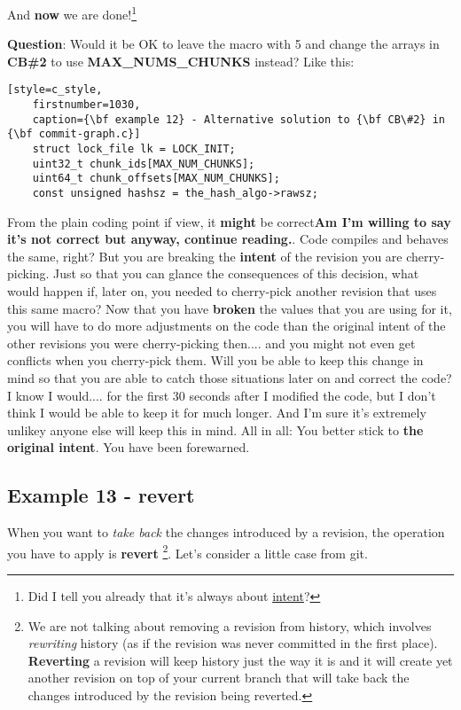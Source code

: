 And {\bf now} we are done!\footnote{Did I tell you already that it's always about \hyperref[intent]{intent}?}

{\bf Question}: Would it be OK to leave the macro with 5 and change the arrays in {\bf CB\#2} to use {\bf MAX\_NUMS\_CHUNKS} instead?
Like this:

\begin{lstlisting}[style=c_style,
	firstnumber=1030,
	caption={\bf example 12} - Alternative solution to {\bf CB\#2} in {\bf commit-graph.c}]
	struct lock_file lk = LOCK_INIT;
	uint32_t chunk_ids[MAX_NUM_CHUNKS];
	uint64_t chunk_offsets[MAX_NUM_CHUNKS];
	const unsigned hashsz = the_hash_algo->rawsz;
\end{lstlisting}

From the plain coding point if view, it {\bf might} be correct{\bf Am I'm willing to say it's not correct but anyway, continue reading.}.
Code compiles and behaves the same, right? But you are breaking the {\bf intent} of the revision you are cherry-picking. Just so that you
can glance the consequences of this decision, what would happen if, later on, you needed to cherry-pick another revision that uses this
same macro? Now that you have {\bf broken} the values that you are using for it, you will have to do more adjustments on the code than
the original intent of the other revisions you were cherry-picking then.... and you might not even get conflicts when you cherry-pick
them. Will you be able to keep this change in mind so that you are able to catch those situations later on and correct the code?
I know I would.... for the first 30 seconds after I modified the code, but I don't think I would be able to keep it for much longer.
And I'm sure it's extremely unlikey anyone else will keep this in mind. All in all: You better stick to {\bf the original intent}.
You have been forewarned.

\subsection{Example 13 - revert}

When you want to {\it take back} the changes introduced by a revision, the operation you have to apply is {\bf revert}
\footnote{We are not talking about removing a revision from history, which involves {\it rewriting} history (as if the revision
was never committed in the first place). {\bf Reverting} a revision will keep history just the way it is and it will create yet
another revision on top of your current branch that will take back the changes introduced by the revision being reverted.}. Let's
consider a little case from git.


